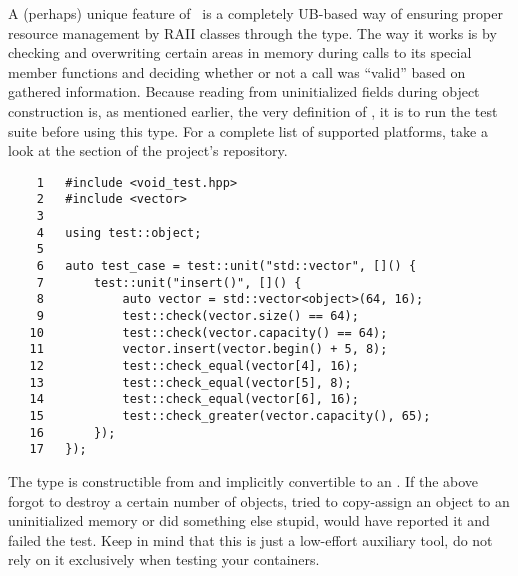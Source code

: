 A (perhaps) unique feature of \voidtest\ is a completely UB-based way of ensuring proper resource
management by RAII classes through the  type. The way it works is by checking
and overwriting certain areas in memory during calls to its special member functions and deciding
whether or not a call was ``valid'' based on gathered information. Because reading from
uninitialized fields during object construction is, as mentioned earlier, the very definition of
, it is  to run the test suite before using this
type. For a complete list of supported platforms, take a look at the  section
of the project's repository.
\begin{verbatim}
    1   #include <void_test.hpp>
    2   #include <vector>
    3
    4   using test::object;
    5
    6   auto test_case = test::unit("std::vector", []() {
    7       test::unit("insert()", []() {
    8           auto vector = std::vector<object>(64, 16);
    9           test::check(vector.size() == 64);
   10           test::check(vector.capacity() == 64);
   11           vector.insert(vector.begin() + 5, 8);
   12           test::check_equal(vector[4], 16);
   13           test::check_equal(vector[5], 8);
   14           test::check_equal(vector[6], 16);
   15           test::check_greater(vector.capacity(), 65);
   16       });
   17   });
\end{verbatim}
The  type is constructible from and implicitly convertible to an .
If the  above forgot to destroy a certain number of objects, tried to copy-assign
an object to an uninitialized memory or did something else stupid,  would have
reported it and failed the test. Keep in mind that this is just a low-effort auxiliary tool, do not
rely on it exclusively when testing your containers.

